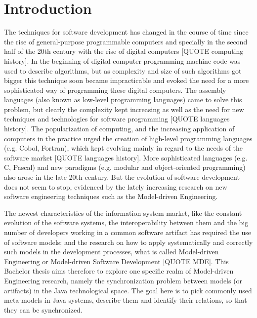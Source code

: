 \documentclass[tuberlin,cic,tc,openright,english,noabntcite]{iiufrgs}
\begin{document}

\tableofcontents


\chapter{Introduction}
The techniques for software development has changed in the course of time since the rise of general-purpose programmable computers and specially in the second half of the 20th century with the rise of digital computers [QUOTE computing history]. In the beginning of digital computer programming machine code was used to describe algorithms, but as complexity and size of such algorithms got bigger this technique soon became impracticable and evoked the need for a more sophisticated way of programming these digital computers. The assembly languages (also known as low-level programming languages) came to solve this problem, but clearly the complexity kept increasing as well as the need for new techniques and technologies for software programming [QUOTE languages history]. The popularization of computing, and the increasing application of computers in the practice urged the creation of high-level programming languages (e.g. Cobol, Fortran), which kept evolving mainly in regard to the needs of the software market [QUOTE languages history]. More sophisticated languages (e.g. C, Pascal) and new paradigms (e.g. modular and object-oriented programming) also arose in the late 20th century. But the evolution of software development does not seem to stop, evidenced by the lately increasing research on new software engineering techniques such as the Model-driven Engineering.

The newest characteristics of the information system market, like the constant evolution of the software systems, the interoperability between them and the big number of developers working in a common software artifact has required the use of software models; and the research on how to apply systematically and correctly such models in the development processes, what is called Model-driven Engineering or Model-driven Software Development [QUOTE MDE]. This Bachelor thesis aims therefore to explore one specific realm of Model-driven Engineering research, namely the synchronization problem between models (or artifacts) in the Java technological space. The goal here is to pick commonly used meta-models in Java systems, describe them and identify their relations, so that they can be synchronized.
\end{document}
